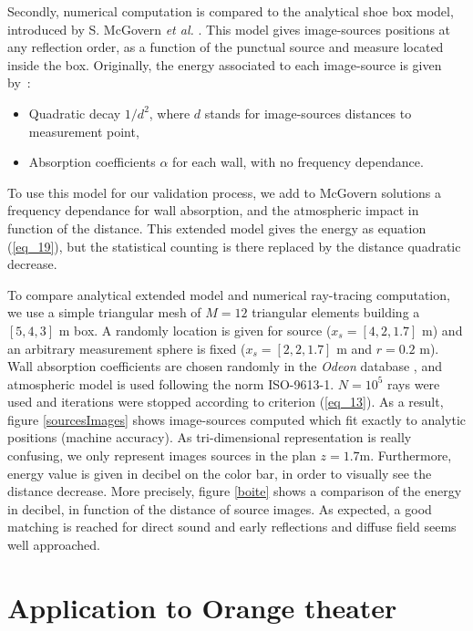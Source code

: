 \documentclass{aes2e}
\begin{document}
Secondly, numerical computation is compared to the analytical shoe box model, introduced by S. McGovern \textit{et al.} \cite{mcgovern}. This model gives image-sources positions at any reflection order, as a function of the punctual source and measure located inside the box. Originally, the energy associated to each image-source is given by~:
\begin{itemize}
\item Quadratic decay $1/d^2$, where $d$ stands for image-sources distances to measurement point,  
\item Absorption coefficients $\alpha$ for each wall, with no frequency dependance.
\end{itemize}
To use this model for our validation process, we add to McGovern solutions a frequency dependance for wall absorption, and the atmospheric impact in function of the distance. This extended model gives the energy as equation (\ref{eq_19}), but the statistical counting is there replaced by the distance quadratic decrease.

To compare analytical extended model and numerical ray-tracing computation, we use a simple triangular mesh of $M=12$ triangular elements building a $[5,4,3]$ m box. A randomly location is given for source ($x_s = [4,2,1.7]$ m) and an arbitrary measurement sphere is fixed ($x_s = [2,2,1.7]$ m and $r=0.2$ m). Wall absorption coefficients are chosen randomly in the \textit{Odeon} database \cite{odeon}, and atmospheric model is used following the norm ISO-9613-1\cite{iso}. $N = 10^ 5$ rays were used and iterations were stopped according to criterion (\ref{eq_13}). As a result, figure \ref{sourcesImages} shows image-sources computed which fit exactly to analytic positions (machine accuracy). As tri-dimensional representation is really confusing, we only represent images sources in the plan $z = 1.7$m. Furthermore, energy value is given in decibel on the color bar, in order to visually see the distance decrease. More precisely, figure \ref{boite} shows a comparison of the energy in decibel, in function of the distance of source images. As expected, a good matching is reached for direct sound and early reflections and diffuse field seems well approached. 
 

\section{Application to Orange theater}
\end{document}
